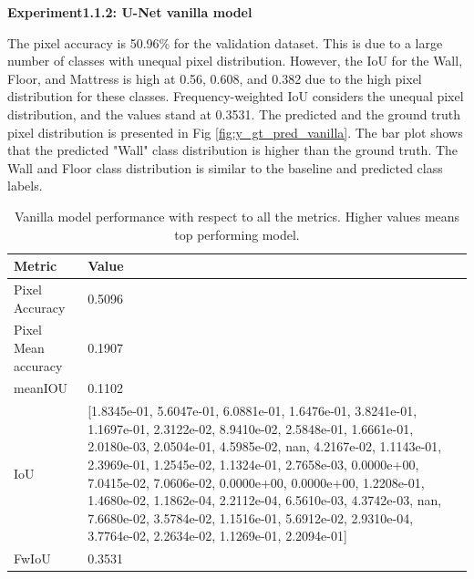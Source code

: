 	{ \bf Experiment1.1.2: U-Net vanilla model}
	
	The pixel accuracy is 50.96\% for the validation dataset. This is due to a large number of classes with unequal pixel distribution. However, the IoU for the Wall, Floor, and Mattress is high at 0.56, 0.608, and 0.382 due to the high pixel distribution for these classes. Frequency-weighted IoU considers the unequal pixel distribution, and the values stand at 0.3531. The predicted and the ground truth pixel distribution is presented in Fig \ref{fig:y_gt_pred_vanilla}. The bar plot shows that the predicted "Wall" class distribution is higher than the ground truth. The Wall and Floor class distribution is similar to the baseline and predicted class labels. 
    
   	
   	\begin{table}
    \begin{center}
    	\begin{tabular}{ | l | p{12cm} |}
    		\hline
    		
    		\cellcolor{purple!30}Metric & \cellcolor{purple!30}Value \\ \hline
    		Pixel Accuracy & 0.5096 \\ \hline
    		Pixel Mean accuracy & 0.1907  \\ \hline
    		meanIOU & 0.1102 \\ \hline
    		IoU & [1.8345e-01, 5.6047e-01, 6.0881e-01, 1.6476e-01, 3.8241e-01, 1.1697e-01, 
    		2.3122e-02, 8.9410e-02, 2.5848e-01, 1.6661e-01, 2.0180e-03, 2.0504e-01, 
    		4.5985e-02,        nan, 4.2167e-02, 1.1143e-01, 2.3969e-01, 1.2545e-02, 
    		1.1324e-01, 2.7658e-03, 0.0000e+00, 7.0415e-02, 7.0606e-02, 0.0000e+00,  
    		0.0000e+00, 1.2208e-01, 1.4680e-02, 1.1862e-04, 2.2112e-04, 6.5610e-03, 
    		4.3742e-03,        nan, 7.6680e-02, 3.5784e-02, 1.1516e-01, 5.6912e-02, 
    		2.9310e-04, 3.7764e-02, 2.2634e-02, 1.1269e-01, 2.2094e-01] \\ \hline
    		FwIoU & 0.3531 \\ \hline
    		\hline
    	\end{tabular}
   		\caption{Vanilla model performance with respect to all the metrics. Higher values means top performing model.}
	    \label{tab:caption}
    \end{center}
	\end{table}

